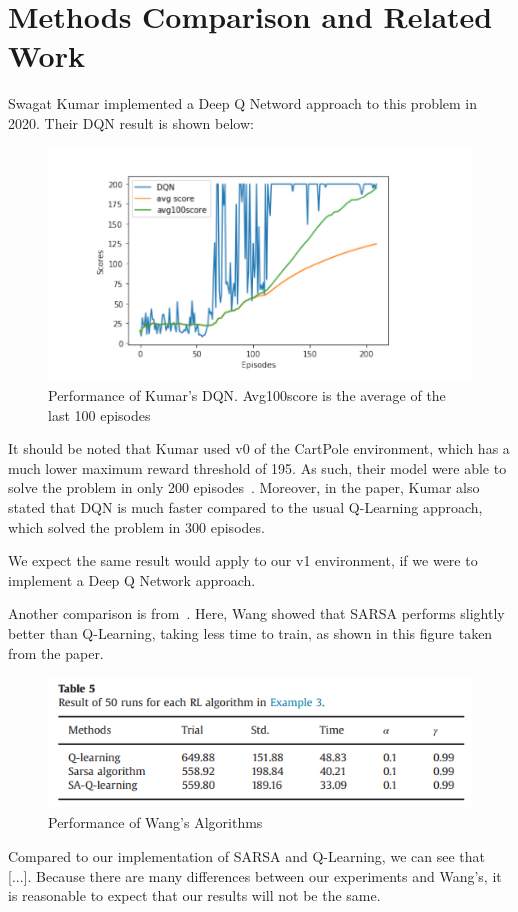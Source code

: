 \section{Methods Comparison and Related Work}

Swagat Kumar implemented a Deep Q Netword approach to this problem in 2020.
Their DQN result is shown below:

\begin{figure}[H] %
    \centering
    \includegraphics[width=0.75\linewidth]{kumar-2020-dqn.png}
    \caption{Performance of Kumar's DQN. Avg100score is the average of the last 100 episodes}
\end{figure}

It should be noted that Kumar used v0 of the CartPole environment, which has a much lower maximum reward threshold of 195. As such,
their model were able to solve the problem in only 200 episodes~\citep{kumar2020balancing}. Moreover, in the paper, Kumar also stated that
DQN is much faster compared to the usual Q-Learning approach, which solved the problem in 300 episodes.

We expect the same result would apply to our v1 environment, if we were to implement a Deep Q Network approach.

Another comparison is from~\citep{wang2013backward}. Here, Wang showed that SARSA performs slightly better than Q-Learning, taking less time to train, as shown
in this figure taken from the paper.

\begin{figure}[H] %
    \centering
    \includegraphics[width=0.75\linewidth]{wang-table.png}
    \caption{Performance of Wang's Algorithms}
\end{figure}

Compared to our implementation of SARSA and Q-Learning, we can see that [...]. Because there are many differences between our
experiments and Wang's, it is reasonable to expect that our results will not be the same.
